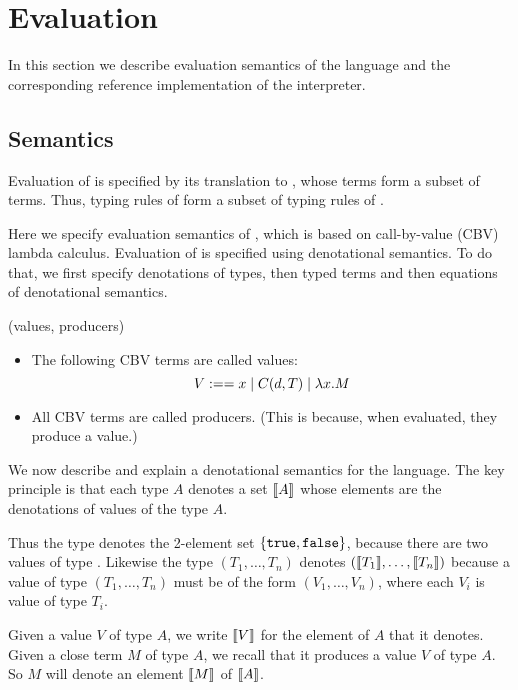 \section{Evaluation}
\label{sec:evaluation}

In this section we describe evaluation semantics of the \langname language
and the corresponding reference implementation of the interpreter.

\subsection{Semantics}
\label{sec:evaluation:semantics}

Evaluation of \langname is specified by its translation to \corelang, whose
terms form a subset of \langname terms. Thus, typing rules of \corelang form
a subset of typing rules of \langname.

Here we specify evaluation semantics of \corelang, which is based on
call-by-value (CBV) lambda calculus. Evaluation of \corelang is specified
using denotational semantics. To do that, we first specify denotations of
types, then typed terms and then equations of denotational semantics.

\begin{definition}
  (values, producers)
  \begin{itemize}
    \item The following CBV terms are called values:
    $$ V :== x \mid C(d, T) \mid \lambda x.M$$
    \item All CBV terms are called producers. (This is because, when evaluated, they produce a value.)
  \end{itemize}
\end{definition}

We now describe and explain a denotational semantics for the \corelang
language. The key principle is that each type $A$ denotes a set $\llbracket A\rrbracket$
whose elements are the denotations of values of the type $A$.

Thus the type  denotes the 2-element set
$\{\lst{true},\lst{false}\}$, because there are two values of type
. Likewise the type $(T_1,\dots,T_n)$ denotes
$(\llbracket T_1\rrbracket,\dots,\llbracket T_n\rrbracket)$ because a value of type $(T_1,\dots,T_n)$
must be of the form $(V_1,\dots,V_n)$, where each $V_i$ is value of type
$T_i$.

Given a value $V$ of type $A$, we write $\llbracket V\rrbracket$ for the element of $A$
that it denotes. Given a close term $M$ of type $A$, we recall that it
produces a value $V$ of type $A$. So $M$ will denote an element $\llbracket M\rrbracket$
of $\llbracket A\rrbracket$.

